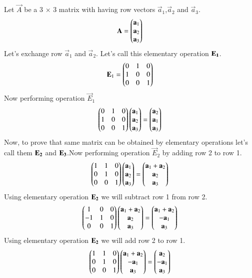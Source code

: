  Let $\vec{A}$ be a 3 $\times$ 3 matrix with having row vectors $\vec{a}_1$,$\vec{a}_2$ and $\vec{a}_3$.
 \begin{align}
 \mathbf{A}=\begin{pmatrix}\mathbf{a}_{1}\\\mathbf{a}_{2}\\\mathbf{a}_{3}\end{pmatrix}
   \end{align}
  Let's exchange row $\vec{a}_1$ and $\vec{a}_2$. Let's call this elementary operation $\bf{E}_1$.
  \begin{align}
  \mathbf{E}_1=\begin{pmatrix}0&1&0\\1&0&0\\0&0&1\end{pmatrix}\\
  \end{align}
  Now performing operation $ \vec{E}_1$
  \begin{align}
  \begin{pmatrix}0&1&0\\1&0&0\\0&0&1\end{pmatrix}\begin{pmatrix}\mathbf{a}_{1}\\\mathbf{a}_{2}\\\mathbf{a}_{3}\end{pmatrix}=
\begin{pmatrix}\mathbf{a}_2\\\mathbf{a}_1\\\mathbf{a}_3\end{pmatrix}\label{eq:solutions/1/2/7/a}
  \end{align}
  Now, to prove that same matrix can be obtained by elementary operations let's call them $\bf{E}_2$ and $\bf{E}_3$.Now performing operation $ \vec{E}_2$ by adding row 2 to row 1.
  \begin{align}
  \begin{pmatrix}1&1&0\\0&1&0\\0&0&1\end{pmatrix}\begin{pmatrix}\mathbf{a}_{1}\\\mathbf{a}_{2}\\\mathbf{a}_{3}\end{pmatrix}
  =\begin{pmatrix}\mathbf{a}_1+\mathbf{a}_2\\\mathbf{a}_2\\\mathbf{a}_3\end{pmatrix}
  \end{align}
  Using elementary operation $\bf{E}_2$ we will subtract row 1 from row 2.
  \begin{align}
  \begin{pmatrix}1&0&0\\-1&1&0\\0&0&1\end{pmatrix}\begin{pmatrix}\mathbf{a}_1+\mathbf{a}_2\\\mathbf{a}_2\\\mathbf{a}_3\end{pmatrix}=
  \begin{pmatrix}\mathbf{a}_1+\mathbf{a}_2\\-\mathbf{a}_1\\\mathbf{a}_3\end{pmatrix}
  \end{align}
  Using elementary operation $\bf{E}_2$ we will add row 2 to row 1.
   \begin{align}
    \begin{pmatrix}1&1&0\\0&1&0\\0&0&1\end{pmatrix} \begin{pmatrix}\mathbf{a}_1+\mathbf{a}_2\\-\mathbf{a}_1\\\mathbf{a}_3\end{pmatrix}=
  \begin{pmatrix}\mathbf{a}_2\\-\mathbf{a}_1\\\mathbf{a}_3\end{pmatrix}
  \end{align}
